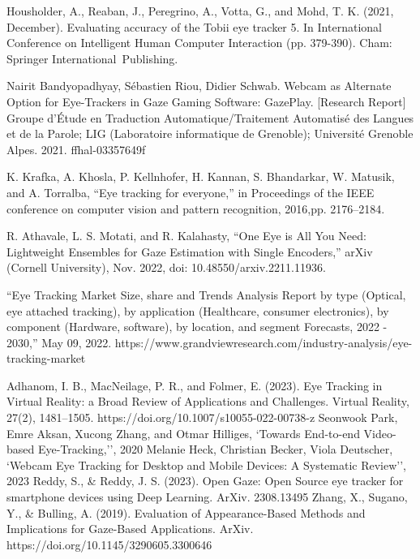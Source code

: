 \documentclass[conference]{IEEEtran}
\begin{document}
\begin{thebibliography}{00}

Housholder, A., Reaban, J., Peregrino, A., Votta, G., and Mohd, T. K. (2021, December). Evaluating accuracy of the Tobii eye tracker 5. In International Conference on Intelligent Human Computer Interaction (pp. 379-390). Cham: Springer International Publishing.

Nairit Bandyopadhyay, Sébastien Riou, Didier Schwab. Webcam as Alternate Option for Eye-Trackers in Gaze Gaming Software: GazePlay. [Research Report] Groupe d’Étude en Traduction Automatique/Traitement Automatisé des Langues et de la Parole; LIG (Laboratoire informatique de Grenoble); Université Grenoble Alpes. 2021. ffhal-03357649f

K. Krafka, A. Khosla, P. Kellnhofer, H. Kannan, S. Bhandarkar, W. Matusik, and A. Torralba, “Eye tracking for everyone,” in Proceedings of the IEEE conference on computer vision and pattern recognition, 2016,pp. 2176–2184.

R. Athavale, L. S. Motati, and R. Kalahasty, “One Eye is All You Need: Lightweight Ensembles for Gaze Estimation with  Single Encoders,” arXiv (Cornell University), Nov. 2022, doi: 10.48550/arxiv.2211.11936.


“Eye Tracking Market Size, share and Trends Analysis Report by type (Optical, eye attached tracking), by application (Healthcare, consumer electronics), by component (Hardware, software), by location, and segment Forecasts, 2022 - 2030,” May 09, 2022. https://www.grandviewresearch.com/industry-analysis/eye-tracking-market

Adhanom, I. B., MacNeilage, P. R., and Folmer, E. (2023). Eye Tracking in Virtual Reality: a Broad Review of Applications and Challenges. Virtual Reality, 27(2), 1481–1505. https://doi.org/10.1007/s10055-022-00738-z
 Seonwook Park, Emre Aksan, Xucong Zhang, and Otmar Hilliges, `Towards End-to-end Video-based Eye-Tracking,'', 2020 
 Melanie Heck, Christian Becker, Viola Deutscher, `Webcam Eye Tracking for Desktop and Mobile Devices: A Systematic Review'', 2023
Reddy, S., \& Reddy, J. S. (2023). Open Gaze: Open Source eye tracker for smartphone devices using Deep Learning. ArXiv. 2308.13495
 Zhang, X., Sugano, Y., \& Bulling, A. (2019). Evaluation of Appearance-Based Methods and Implications for Gaze-Based Applications. ArXiv. https://doi.org/10.1145/3290605.3300646


\end{thebibliography}
\end{document}
